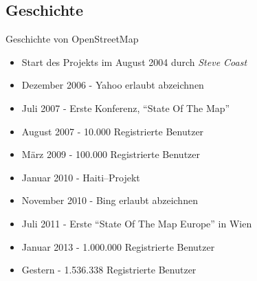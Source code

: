 \documentclass{beamer}
\begin{document}
\subsection{Geschichte}

{


\begin{frame}{Geschichte von OpenStreetMap}
  \vspace{0.6cm}
\begin{itemize}
  \item Start des Projekts im August 2004 durch \emph{Steve Coast}
  \item Dezember 2006 - Yahoo erlaubt abzeichnen
  \item Juli 2007 - Erste Konferenz, "`State Of The Map"'
  \item August 2007 - 10.000 Registrierte Benutzer
  \item März 2009 - 100.000 Registrierte Benutzer
  \item Januar 2010 - Haiti--Projekt
  \item November 2010 - Bing erlaubt abzeichnen
  \item Juli 2011 - Erste "`State Of The Map Europe"' in Wien
  \item Januar 2013 - 1.000.000 Registrierte Benutzer
  \item Gestern - 1.536.338 Registrierte Benutzer
\end{itemize}

\end{frame}
}
\end{document}

